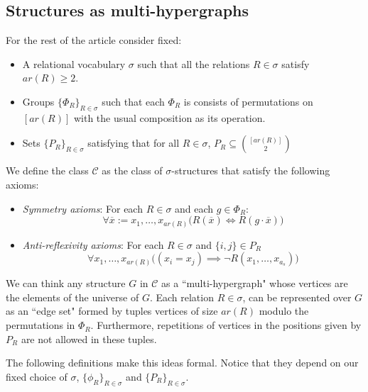 \documentclass[12pt,notitlepage,a4paper]{article}
\theoremstyle{definition}
\begin{document}
\subsection{Structures as multi-hypergraphs} \label{sect:structures}

For the rest of the article consider fixed:
\begin{itemize}
	\item A relational vocabulary $\sigma$ such 
	that all the relations $R\in\sigma$ satisfy $ar(R)\geq 2$. 
	\item 
	Groups $\{ \Phi_R \}_{R\in \sigma}$
	such that each $\Phi_R$ is consists of 
	permutations on $[ar(R)]$ with the usual 
	composition as its operation.	
	\item 
	Sets $\{P_R\}_{R\in \sigma}$ satisfying that for 
	all $R\in \sigma$, 
	$P_R\subseteq \binom{[ar(R)]}{2}$
	
	
\end{itemize}
%



We define the class $\mathcal{C}$ as the 
class of $\sigma$-structures that
satisfy the 
following axioms: 
\begin{itemize}
	\item \textit{Symmetry axioms}: For each $R\in \sigma$ and
	each $g\in \Phi_R$:
	\[ \forall \overline{x}:=x_1,\dots, x_{ar(R)} \big(  R(\overline{x})
	\iff R(g\cdot\overline{x}) \big)    \]
	\item \textit{Anti-reflexivity axioms}: For each 
	$R\in \sigma$ and $\{i,j\}\in P_R$
	\[ \forall x_1,\dots, x_{ar(R)} 
	\big( (x_i=x_j) \implies \neg R(x_1,\dots, x_{a_s})
	\big)\]
	\end{itemize}

We can think any structure $G$ in $\mathcal{C}$
as a ``multi-hypergraph" whose vertices are the elements
of the universe of $G$. Each relation $R\in \sigma$, can be 
represented over $G$ as an ``edge set" formed by tuples vertices
of size $ar(R)$ modulo the permutations in $\Phi_R$. Furthermore, 
repetitions of vertices in the positions given by
$P_R$ are not allowed in these tuples.\par
The following definitions make this ideas formal. Notice that they 
depend on our fixed choice of $\sigma$, $\{\phi_R\}_{R\in \sigma}$
and $\{P_R\}_{R\in \sigma}$. 
\end{document}
